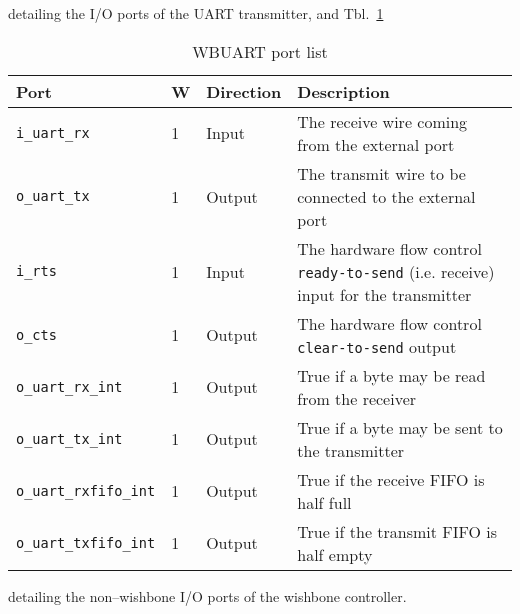 \documentclass{gqtekspec}
\begin{document}
detailing the I/O ports of the UART transmitter, and Tbl.~\ref{tbl:wbports}
\begin{table}\begin{center}\begin{tabular}{|p{1.15in}|p{0.1in}|p{0.75in}|p{3.375in}|}
\rowcolor[gray]{0.85} Port & W & Direction & Description \\\hline\hline
{\tt i\_uart\_rx}& 1 & Input & The receive wire coming from the external port\\\hline
{\tt o\_uart\_tx}& 1 & Output & The transmit wire to be connected to the external port\\\hline
{\tt i\_rts}& 1 & Input  & The hardware flow control {\tt ready-to-send} (i.e. receive) input for the transmitter\\\hline
{\tt o\_cts}& 1 & Output & The hardware flow control {\tt clear-to-send} output\\\hline
{\tt o\_uart\_rx\_int}	& 1 & Output & True if a byte may be read from the receiver\\\hline
{\tt o\_uart\_tx\_int}	& 1 & Output & True if a byte may be sent to the transmitter\\\hline
{\tt o\_uart\_rxfifo\_int}&1& Output & True if the receive FIFO is half full\\\hline
{\tt o\_uart\_txfifo\_int}&1& Output & True if the transmit FIFO is half empty\\\hline
\end{tabular}\caption{WBUART port list}\label{tbl:wbports}
\end{center}\end{table}
detailing the non--wishbone I/O ports of the wishbone controller.



\end{document}

